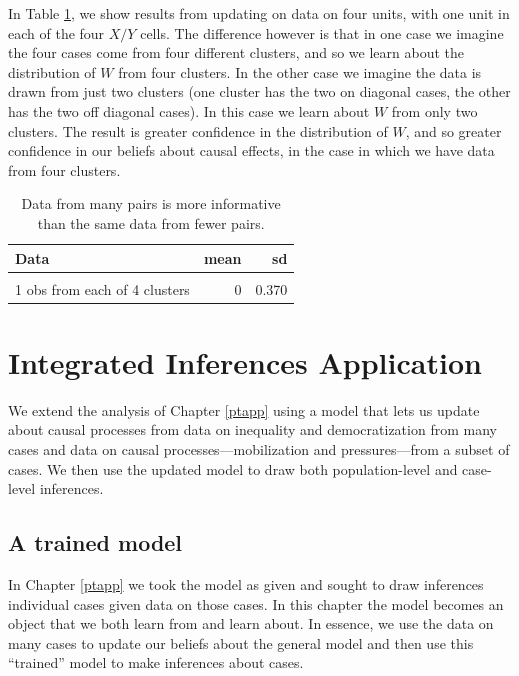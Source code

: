 \documentclass[
  12pt,
]{book}
\newenvironment{headerbox}{
  \definecolor{shadecolor}{rgb}{0.8, 0.8, 0.8}  %
  \color{black}
  \begin{shaded}}{\end{shaded}}
\begin{document}
In Table \ref{tab:cluster}, we show results from updating on data on four units, with one unit in each of the four \(X/Y\) cells. The difference however is that in one case we imagine the four cases come from four different clusters, and so we learn about the distribution of \(W\) from four clusters. In the other case we imagine the data is drawn from just two clusters (one cluster has the two on diagonal cases, the other has the two off diagonal cases). In this case we learn about \(W\) from only two clusters. The result is greater confidence in the distribution of \(W\), and so greater confidence in our beliefs about causal effects, in the case in which we have data from four clusters.

\begin{table}

\caption{\label{tab:cluster}Data from many pairs is more informative than the same data from fewer pairs.}
\centering
\begin{tabular}[t]{lrr}
\toprule
Data & mean & sd\\
\midrule
\cellcolor{gray!6}{2 obs from each of 2 clusters} & \cellcolor{gray!6}{0} & \cellcolor{gray!6}{0.455}\\
1 obs from each of 4 clusters & 0 & 0.370\\
\bottomrule
\end{tabular}
\end{table}

\hypertarget{mixingapp}{%
\chapter{Integrated Inferences Application}\label{mixingapp}}

\begin{headerbox}
We extend the analysis of Chapter \ref{ptapp} using a model that lets us update about causal processes from data on inequality and democratization from many cases and data on causal processes---mobilization and pressures---from a subset of cases. We then use the updated model to draw both population-level and case-level inferences.

\end{headerbox}

\hypertarget{a-trained-model}{%
\section{A trained model}\label{a-trained-model}}

In Chapter \ref{ptapp} we took the model as given and sought to draw inferences individual cases given data on those cases. In this chapter the model becomes an object that we both learn from and learn about. In essence, we use the data on many cases to update our beliefs about the general model and then use this ``trained'' model to make inferences about cases.
\end{document}

